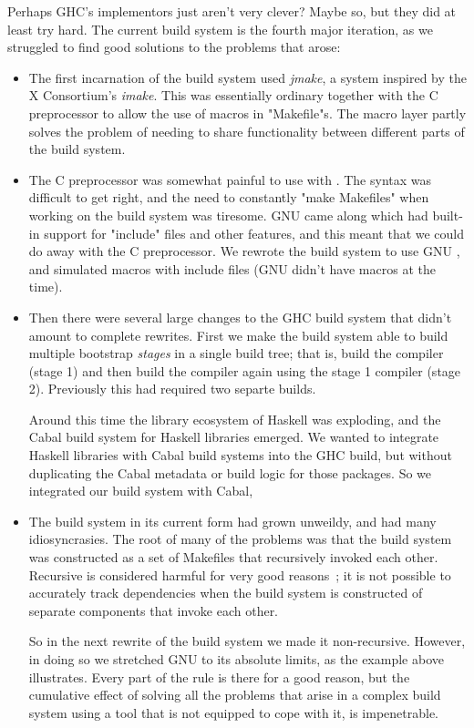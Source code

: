 Perhaps GHC's implementors just aren't very clever?  Maybe so, but
they did at least try hard. The current build system is the
fourth major iteration, as we struggled to find good solutions to the
problems that arose:

\begin{itemize}
\item The first incarnation of the build system used \emph{jmake}, a
  system inspired by the X Consortium's \emph{imake}.  This was
  essentially ordinary \make{} together with the C preprocessor to
  allow the use of macros in \lst"Makefile"s.  The macro layer partly
  solves the problem of needing to share functionality between
  different parts of the build system.

\item The C preprocessor was somewhat painful to use with \make{}.
  The syntax was difficult to get right, and the need to constantly
  \lst"make Makefiles" when working on the build system was tiresome.  GNU
  \make{} came along which had built-in support for \lst"include" files and
  other features, and this meant that we could do away with the C
  preprocessor.  We rewrote the build system to use GNU \make{}, and
  simulated macros with include files (GNU \make{} didn't have macros at
  the time).

\item Then there were several large changes to the GHC build system
  that didn't amount to complete rewrites.  First we make the build
  system able to build multiple bootstrap \emph{stages} in a single
  build tree; that is, build the compiler (stage 1) and then build the
  compiler again using the stage 1 compiler (stage 2).  Previously
  this had required two separte builds.

  Around this time the library ecosystem of Haskell was exploding, and
  the Cabal build system for Haskell libraries emerged.  We wanted to
  integrate Haskell libraries with Cabal build systems into the GHC
  build, but without duplicating the Cabal metadata or build logic for
  those packages.  So we integrated our build system with Cabal,

\item The build system in its current form had grown unweildy, and had
  many idiosyncrasies.  The root of many of the problems was that the
  build system was constructed as a set of Makefiles that recursively
  invoked each other.  Recursive \make{} is considered harmful
  for very good reasons~\cite{miller:recursive_make}; it is not possible to
  accurately track dependencies when the build system is constructed
  of separate components that invoke each other.

  So in the next rewrite of the build system we made it non-recursive.
  However, in doing so we stretched GNU \make{} to its absolute
  limits, as the example above illustrates.  Every part of the rule is
  there for a good reason, but the cumulative effect of solving all
  the problems that arise in a complex build system using a tool that
  is not equipped to cope with it, is impenetrable.
\end{itemize}
